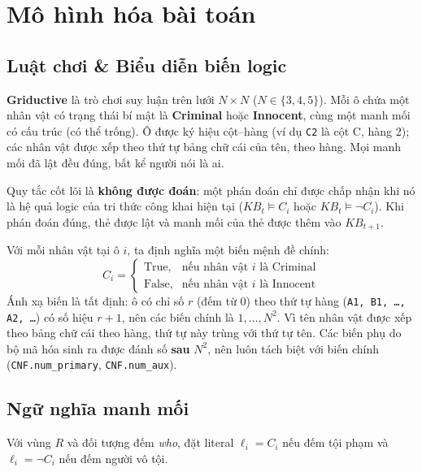 \documentclass{article}
\newcommand{\code}[1]{\texttt{#1}}
\newcommand{\KB}{\mathit{KB}}
\begin{document}
\section{Mô hình hóa bài toán}

\subsection{Luật chơi \& Biểu diễn biến logic}
\textbf{Griductive} là trò chơi suy luận trên lưới $N \times N$ ($N \in \{3,4,5\}$). Mỗi ô chứa một nhân vật có trạng thái bí mật là \textbf{Criminal} hoặc \textbf{Innocent}, cùng một manh mối có cấu trúc (có thể trống). Ô được ký hiệu cột--hàng (ví dụ \code{C2} là cột C, hàng 2); các nhân vật được xếp theo thứ tự bảng chữ cái của tên, theo hàng. Mọi manh mối đã lật đều đúng, bất kể người nói là ai.

Quy tắc cốt lõi là \textbf{không được đoán}: một phán đoán chỉ được chấp nhận khi nó là hệ quả logic của tri thức công khai hiện tại ($\KB_t \models C_i$ hoặc $\KB_t \models \neg C_i$). Khi phán đoán đúng, thẻ được lật và manh mối của thẻ được thêm vào $\KB_{t+1}$.

Với mỗi nhân vật tại ô $i$, ta định nghĩa một biến mệnh đề chính:
\begin{equation}
C_i =
\begin{cases}
\text{True}, & \text{nếu nhân vật } i \text{ là Criminal} \\
\text{False}, & \text{nếu nhân vật } i \text{ là Innocent}
\end{cases}
\end{equation}
Ánh xạ biến là tất định: ô có chỉ số $r$ (đếm từ 0) theo thứ tự hàng (\code{A1, B1, \dots, A2, \dots}) có số hiệu $r+1$, nên các biến chính là $1,\dots,N^2$. Vì tên nhân vật được xếp theo bảng chữ cái theo hàng, thứ tự này trùng với thứ tự tên. Các biến phụ do bộ mã hóa sinh ra được đánh số \textbf{sau} $N^2$, nên luôn tách biệt với biến chính (\code{CNF.num\_primary}, \code{CNF.num\_aux}).

\subsection{Ngữ nghĩa manh mối}
Với vùng $R$ và đối tượng đếm \textit{who}, đặt literal $\ell_i = C_i$ nếu đếm tội phạm và $\ell_i = \neg C_i$ nếu đếm người vô tội.
\end{document}
